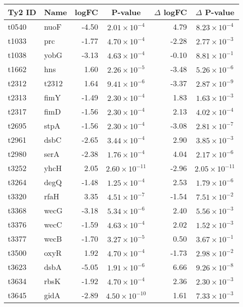 \begin{table}
\begin{tabular}{ l
    				l
				r
    				c
				r
				c
				}
    \\
     \toprule
    \textbf{Ty2 ID} & \textbf{Name} & \textbf{logFC} & \textbf{P-value} & \textbf{$\Delta$ logFC} & \textbf{$\Delta$ P-value} \\
    \midrule
    t0540 & nuoF & -4.50 & $2.01\times10^{-4}$ & 4.79 & $8.23\times10^{-4}$\\
    t1033 & prc & -1.77 & $4.70\times10^{-4}$ & -2.28 & $2.77\times10^{-3}$\\
    t1038 & yobG & -3.13 & $4.63\times10^{-4}$ & -0.10 & $8.81\times10^{-1}$\\
    t1662 & hns & 1.60 & $2.26\times10^{-5}$ & -3.48 & $5.26\times10^{-6}$\\
    t2312 & t2312 & 1.64 & $9.41\times10^{-6}$ & -3.37 & $2.87\times10^{-9}$\\
    t2313 & fimY & -1.49 & $2.30\times10^{-4}$ & 1.83 & $1.63\times10^{-3}$\\
    t2317 & fimD & -1.56 & $2.30\times10^{-4}$ & 2.13 & $4.02\times10^{-4}$\\
    t2695 & stpA & -1.56 & $2.30\times10^{-4}$ & -3.08 & $2.81\times10^{-7}$\\
    t2961 & dsbC & -2.65 & $3.44\times10^{-4}$ & 2.90 & $3.85\times10^{-3}$\\
    t2980 & serA & -2.38 & $1.76\times10^{-4}$ & 4.04 & $2.17\times10^{-6}$\\
    t3252 & yhcH & 2.05 & $2.60\times10^{-11}$ & -2.96 & $2.05\times10^{-11}$\\
    t3264 & degQ & -1.48 & $1.25\times10^{-4}$ & 2.53 & $1.79\times10^{-6}$\\
    t3320 & rfaH & 3.35 & $4.51\times10^{-7}$ & -1.54 & $7.51\times10^{-2}$\\
    t3368 & wecG & -3.18 & $5.34\times10^{-6}$ & 2.40 & $5.56\times10^{-3}$\\
    t3376 & wecC & -1.59 & $4.63\times10^{-4}$ & 2.02 & $1.52\times10^{-3}$\\
    t3377 & wecB & -1.70 & $3.27\times10^{-5}$ & 0.50 & $3.67\times10^{-1}$\\
    t3500 & oxyR & 1.92 & $4.70\times10^{-4}$ & -1.73 & $2.98\times10^{-2}$\\
    t3623 & dsbA & -5.05 & $1.91\times10^{-6}$ & 6.66 & $9.26\times10^{-8}$\\
    t3634 & rbsK & -1.92 & $4.70\times10^{-4}$ & 2.36 & $2.30\times10^{-3}$\\
    t3645 & gidA & -2.89 & $4.50\times10^{-10}$ & 1.61 & $7.33\times10^{-3}$\\

\end{tabular}
\end{table}

